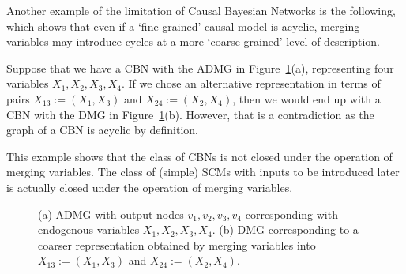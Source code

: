 Another example of the limitation of Causal Bayesian Networks is the following, which shows that even if a `fine-grained' causal model is acyclic, merging variables may introduce cycles at a more `coarse-grained' level of description.
\begin{Eg}\label{eg:coarse_grained_cbn}
Suppose that we have a CBN with the ADMG in Figure~\ref{fig:coarsening_variables_introduces_cycles}(a),
representing four variables $X_1,X_2,X_3,X_4$. If we chose an alternative representation in terms of 
pairs $X_{13}:=(X_1,X_3)$ and $X_{24}:=(X_2,X_4)$, then we would end up with a CBN with the DMG in Figure~\ref{fig:coarsening_variables_introduces_cycles}(b). However, that is a contradiction as the graph of a CBN is acyclic by definition.
\end{Eg}
This example shows that the class of CBNs is not closed under the operation of merging variables.
The class of (simple) SCMs with inputs to be introduced later is actually closed under the operation of merging variables.

\begin{figure}[tb]
\centering
{}
  \caption{(a) ADMG with output nodes $v_1, v_2, v_3, v_4$ corresponding with endogenous variables $X_1, X_2, X_3, X_4$.
  (b) DMG corresponding to a coarser representation obtained by merging variables into $X_{13} := (X_1,X_3)$ and $X_{24} := (X_2,X_4)$.
  }
\label{fig:coarsening_variables_introduces_cycles}
\end{figure}

